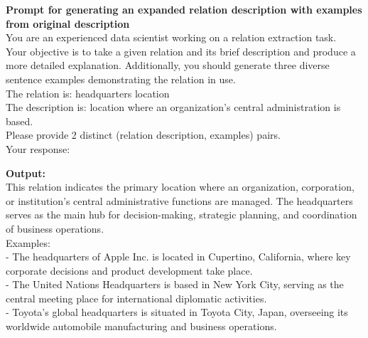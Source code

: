 \begin{table*}[ht]
    \centering
    \begin{mdframed}[linewidth=1pt] %
        \textbf{Prompt for generating an expanded relation description with examples from original description} \\
        \hrulefill
        You are an experienced data scientist working on a relation extraction task. \\
        Your objective is to take a given relation and its brief description and produce a more detailed explanation. Additionally, you should generate three diverse sentence examples demonstrating the relation in use. \\
        The relation is: headquarters location \\
        The description is: location where an organization's central administration is based. \\
        Please provide 2 distinct (relation description, examples) pairs. \\
        Your response:
    \end{mdframed}

    \vspace{5pt} %

    \begin{mdframed}[linewidth=1pt] %
        \textbf{Output:} \\
        \hrulefill
        This relation indicates the primary location where an organization, corporation, or institution's central administrative functions are managed. The headquarters serves as the main hub for decision-making, strategic planning, and coordination of business operations.\\
        Examples: \\
        - The headquarters of Apple Inc. is located in Cupertino, California, where key corporate decisions and product development take place. \\
        - The United Nations Headquarters is based in New York City, serving as the central meeting place for international diplomatic activities. \\
        - Toyota's global headquarters is situated in Toyota City, Japan, overseeing its worldwide automobile manufacturing and business operations. \\

        \vspace{5pt} %


\end{mdframed}
\end{table*}

